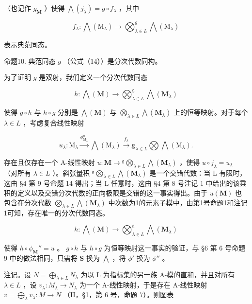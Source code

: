 （也记作 \(g_{\mathbf{M}}\) ）使得 \(\bigwedge (j_{\lambda}) = g \circ f_{\lambda}\) ，其中

\[
f _ {\lambda}: \bigwedge (\mathrm{M} _ {\lambda}) \rightarrow \bigotimes_ {\lambda \in L} ^ {g} \bigwedge (\mathrm{M} _ {\lambda})
\]

表示典范同态。

命题10. 典范同态 \(g\) （公式（14））是分次代数同构。

为了证明 \(g\) 是双射，我们定义一个分次代数同态

\[
h: \bigwedge (\mathbf {M}) \rightarrow \bigotimes_ {\lambda \in L} ^ {\mathfrak {g}} \bigwedge (\mathbf {M} _ {\lambda})\tag{15}
\]

使得 \(g \circ h\) 与 \(h \circ g\) 分别是 \(\bigwedge(\mathbf{M})\) 与 \(\bigotimes_{\lambda \in L} \bigwedge(\mathbf{M}_{\lambda})\) 上的恒等映射。对于每个 \(\lambda \in L\) ，考虑复合线性映射

\[
u _ {\lambda}: \mathrm{M} _ {\lambda} \xrightarrow {\phi_ {\mathrm{M} _ {\lambda}} ^ {n}} \bigwedge (\mathrm{M} _ {\lambda}) \xrightarrow {f _ {\lambda}} \mathbf {g} _ {\lambda \in L} \bigotimes \bigwedge (\mathrm{M} _ {\lambda}).
\]

存在且仅存在一个 A-线性映射 \(u: \mathbf{M} \to {}^{\mathfrak{g}} \bigotimes_{\lambda \in L} \bigwedge (\mathbf{M}_{\lambda})\) ，使得 \(u \circ j_{\lambda} = u_{\lambda}\) （对所有 \(\lambda \in L\) ）。斜张量积 \({}^{\mathfrak{g}} \bigotimes_{\lambda \in L} \bigwedge (\mathbf{M}_{\lambda})\) 是一个交错代数：当 L 有限时，这由 §4 第 9 号命题 14 得出；当 L 任意时，这由 §4 第 8 号注记 1 中给出的该乘积的定义以及交错分次代数的正向极限是交错的这一事实得出。由于 \(u(\mathbf{M})\) 也包含在分次代数 \(\bigotimes_{\lambda \in L} \bigwedge (\mathbf{M}_{\lambda})\) 中次数为1的元素子模中，由第1号命题1和注记1可知，存在唯一的分次代数同态。

\[
h: \bigwedge (\mathbf {M}) \rightarrow \bigotimes_ {\lambda \in L} ^ {\mathfrak {g}} \bigwedge (\mathbf {M} _ {\lambda})
\]

使得 \(h \circ \phi_{\mathbf{M}}'' = u\) 。 \(g \circ h\) 与 \(h \circ g\) 为恒等映射这一事实的验证，与 §6 第 6 号命题 9 中的做法相同，只需将 \(\mathbf{S}\) 换为 \(\bigwedge\) ，将 \(\phi'\) 换为 \(\phi''\) 。

注记。设 \(N = \bigoplus_{\lambda \in L} N_{\lambda}\) 为以 L 为指标集的另一族 A-模的直和，并且对所有 \(\lambda \in L\) ，设 \(v_{\lambda}: M_{\lambda} \to N_{\lambda}\) 为一个 A-线性映射，于是存在 A-线性映射 \(v = \bigoplus_{\lambda} v_{\lambda}: M \to N\) （II，§1，第 6 号，命题 7）。则图表

